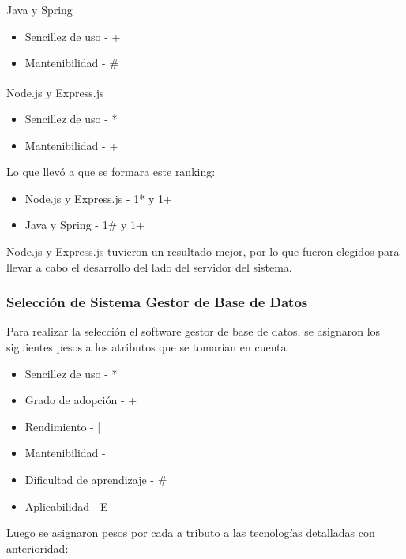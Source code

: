 \documentclass[twoside]{article}
\begin{document}
Java y Spring
\begin{itemize}
    \item Sencillez de uso - +
    \item Mantenibilidad - \#
\end{itemize}
Node.js\textsuperscript{\textregistered} y Express.js
\begin{itemize}
    \item Sencillez de uso - *
    \item Mantenibilidad - +
\end{itemize}
Lo que llevó a que se formara este ranking:
\begin{itemize}
    \item Node.js y Express.js - 1* y 1+
    \item Java y Spring - 1\# y 1+
\end{itemize}
Node.js y Express.js tuvieron un resultado mejor, por lo que fueron elegidos para llevar a cabo el desarrollo del lado del servidor del sistema.
\subsubsection{Selección de Sistema Gestor de Base de Datos}
Para realizar la selección el software gestor de base de datos, se asignaron los siguientes pesos a los atributos que se tomarían en cuenta:
\begin{itemize}
    \item Sencillez de uso - *
    \item Grado de adopción - +
    \item Rendimiento - |
    \item Mantenibilidad - |
    \item Dificultad de aprendizaje - \#
    \item Aplicabilidad - E
\end{itemize}
Luego se asignaron pesos por cada a tributo a las tecnologías detalladas con anterioridad:
\end{document}
